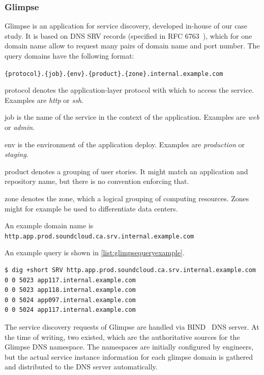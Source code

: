 \subsubsection{Glimpse}
\label{subsubsec:glimpse}

Glimpse is an application for service discovery, developed in-house of our case study. It is based on DNS SRV records (specified in RFC 6763~\cite{rfc6763}), which for one domain name allow to request many pairs of domain name and port number. The query domains have the following format:

\lstinline!{protocol}.{job}.{env}.{product}.{zone}.internal.example.com!
\begin{tdescription}
  \item[protocol] denotes the application-layer protocol with which to access the service. Examples are \emph{http} or \emph{ssh}.
  \item[job] is the name of the service in the context of the application. Examples are \emph{web} or \emph{admin}.
  \item[env] is the environment of the application deploy. Examples are \emph{production} or \emph{staging}.
  \item[product] denotes a grouping of user stories. It might match an application and repository name, but there is no convention enforcing that.
  \item[zone] denotes the zone, which a logical grouping of computing resources. Zones might for example be used to differentiate data centers.
\end{tdescription}

An example domain name is \\ \lstinline{http.app.prod.soundcloud.ca.srv.internal.example.com}

An example query is shown in \autoref{list:glimpsequeryexample}.

\begin{lstlisting}[caption=Service discovery via Glimpse; Query example ,label=list:glimpsequeryexample,numbers=none]
$ dig +short SRV http.app.prod.soundcloud.ca.srv.internal.example.com
0 0 5023 app117.internal.example.com
0 0 5023 app118.internal.example.com
0 0 5024 app097.internal.example.com
0 0 5024 app117.internal.example.com
\end{lstlisting}

The service discovery requests of Glimpse are handled via BIND~\cite{bind} DNS server. At the time of writing, two existed, which are the authoritative sources for the Glimpse DNS namespace. The namespaces are initially configured by engineers, but the actual service instance information for each glimpse domain is gathered and distributed to the DNS server automatically.

